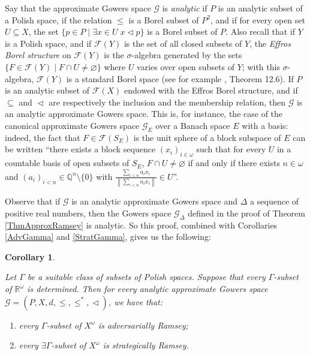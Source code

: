 \documentclass[a4paper,11pt]{article}
\newtheorem{cor}[thm]{Corollary}
\theoremstyle{definition}
\numberwithin{equation}{section}
\newcommand{\R}{\mathbb{R}}
\newcommand{\G}{\mathcal{G}}
\begin{document}
Say that the approximate Gowers space $\G$ is \emph{analytic} if $P$ is an analytic subset of a Polish space, if the relation $\leqslant$ is a Borel subset of $P^2$, and if for every open set $U \subseteq X$, the set $\{p \in P \mid \exists x \in U \; x \vartriangleleft p\}$ is a Borel subset of $P$. Also recall that if $Y$ is a Polish space, and if $\mathcal{F}(Y)$ is the set of all closed subsets of $Y$, the \emph{Effros Borel structure} on $\mathcal{F}(Y)$ is the $\sigma$-algebra generated by the sets $\{F \in \mathcal{F}(Y) \mid F \cap U \neq \varnothing\}$ where $U$ varies over open subsets of $Y$; with this $\sigma$-algebra, $\mathcal{F}(Y)$ is a standard Borel space (see for example \cite{kechris}, Theorem 12.6). If $P$ is an analytic subset of $\mathcal{F}(X)$ endowed with the Effros Borel structure, and if $\subseteq$ and $\vartriangleleft$ are respectively the inclusion and the membership relation, then $\G$ is an analytic approximate Gowers space. This is, for instance, the case of the canonical approximate Gowers space $\G_E$ over a Banach space $E$ with a basis: indeed, the fact that $F \in \mathcal{F}(S_E)$ is the unit sphere of a block subspace of $E$ can be written ``there exists a block sequence $(x_i)_{i \in \omega}$ such that for every $U$ in a countable basis of open subsets of $S_E$, $F \cap U \neq \varnothing$ if and only if there exists $n \in \omega$ and $(a_i)_{i < n} \in \mathbb{Q}^n \setminus \{0\}$ with $\frac{\sum_{i < n}a_i x_i}{\left\|\sum_{i < n}a_i x_i\right\|} \in U$''.

\smallskip

Observe that if $\G$ is an analytic approximate Gowers space and $\Delta$ a sequence of positive real numbers, then the Gowers space $\G_\Delta$ defined in the proof of Theorem \ref{ThmApproxRamsey} is analytic. So this proof, combined with Corollaries \ref{AdvGamma} and \ref{StratGamma}, gives us the following:

\begin{cor}\label{ApproxGamma}

Let $\Gamma$ be a suitable class of subsets of Polish spaces. Suppose that every $\Gamma$-subset of $\R^\omega$ is determined. Then for every analytic approximate Gowers space $\G = (P, X, d, \leqslant, \leqslant^*, \vartriangleleft)$, we have that:

\begin{enumerate}

\item every $\Gamma$-subset of $X^\omega$ is adversarially Ramsey;

\item every $\exists\Gamma$-subset of $X^\omega$ is strategically Ramsey.

\end{enumerate}

\end{cor}
\end{document}
